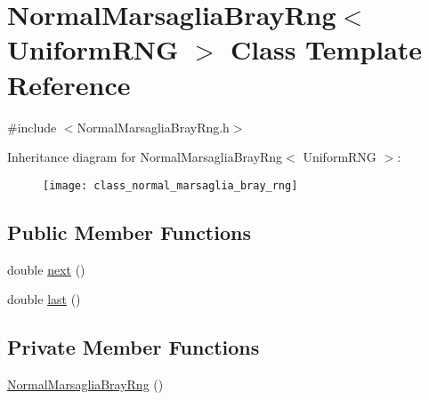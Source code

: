 \hypertarget{class_normal_marsaglia_bray_rng}{}\section{Normal\+Marsaglia\+Bray\+Rng$<$ Uniform\+R\+NG $>$ Class Template Reference}
\label{class_normal_marsaglia_bray_rng}


{\ttfamily \#include $<$Normal\+Marsaglia\+Bray\+Rng.\+h$>$}

Inheritance diagram for Normal\+Marsaglia\+Bray\+Rng$<$ Uniform\+R\+NG $>$\+:\begin{figure}[H]
\begin{center}
\leavevmode
\texttt{[image: class\_normal\_marsaglia\_bray\_rng]}
\end{center}
\end{figure}
\subsection*{Public Member Functions}
\begin{DoxyCompactItemize}
\item 
double \hyperlink{class_normal_marsaglia_bray_rng_a2cc54f5f331a5bd71eedc67c84db7279}{next} ()
\item 
double \hyperlink{class_normal_marsaglia_bray_rng_af90ac458fcbf302dfad98816132658c2}{last} ()
\end{DoxyCompactItemize}
\subsection*{Private Member Functions}
\begin{DoxyCompactItemize}
\item 
\hyperlink{class_normal_marsaglia_bray_rng_a4d225dedc26e6dcf154a2902827b2ede}{Normal\+Marsaglia\+Bray\+Rng} ()
\end{DoxyCompactItemize}
